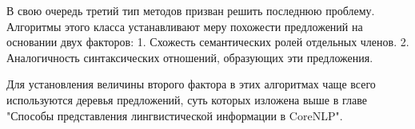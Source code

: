 В свою очередь третий тип методов призван решить последнюю проблему. 
Алгоритмы этого класса устанавливают меру похожести предложений на основании двух факторов:
1. Схожесть семантических ролей отдельных членов.
2. Аналогичность синтаксических отношений, образующих эти предложения.

Для установления величины второго фактора в этих алгоритмах чаще всего используются
деревья предложений, суть которых изложена выше в главе "Способы представления лингвистической информации в CoreNLP".


